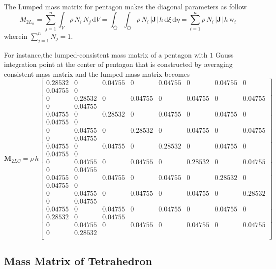 The Lumped mass matrix for pentagon makes the diagonal parameters as follow
\begin{equation}
{M}_{2L_{ii}} = \sum_{j=1}^n \int_{V}  \rho \, N_i \, N_j \, \mathrm{d} V  = \int_{\pentagon} \int_{\pentagon} \rho \, N_i \, |\mathbf{J}| \, h \,  \mathrm{d} \xi \, \mathrm{d} \eta =  \sum_{i=1}^n  \rho  \, N_i \, |\mathbf{J}| \, h \, \mathrm{w}_i
\label{LumMass2D}
\end{equation}
wherein $\sum_{j=1}^n N_j = 1$. 

For instance,the lumped-consistent mass matrix of a pentagon  with $1$ Gauss integration point at the center of pentagon that is constructed by averaging consistent mass matrix and the lumped mass matrix becomes 
\begin{equation}
\mathbf{M}_{2LC}  = \rho \, h
\begin{bmatrix}
0.28532 & 0 & 0.04755 & 0 & 0.04755 & 0 & 0.04755 & 0 \\ 0.04755 & 0 \\
0 & 0.28532 & 0 & 0.04755 & 0 & 0.04755 & 0 & 0.04755\\ 0 & 0.04755
\\
0.04755 & 0 & 0.28532 & 0 & 0.04755 & 0 & 0.04755 & 0 \\ 0.04755 & 0\\
0 & 0.04755 & 0 & 0.28532 & 0 & 0.04755 & 0 & 0.04755\\ 0 & 0.04755 \\
0.04755 & 0 & 0.04755 & 0 & 0.28532 & 0 & 0.04755 & 0 \\ 0.04755 & 0 \\
0 & 0.04755 & 0 & 0.04755 & 0 & 0.28532 & 0 & 0.04755\\ 0 & 0.04755 \\
0.04755 & 0 & 0.04755 & 0 & 0.04755 & 0 & 0.28532 & 0\\ 0.04755 & 0\\
0 & 0.04755 & 0 & 0.04755 & 0 & 0.04755 & 0 & 0.28532\\ 0 & 0.04755\\
0.04755 & 0 & 0.04755 & 0 & 0.04755 & 0 & 0.04755 & 0 \\ 0.28532 & 0 & 0.04755\\
0 & 0.04755 & 0 & 0.04755 & 0 & 0.04755 & 0 & 0.04755\\ 0 & 0.28532\\
\end{bmatrix} 
\label{LumconsMassMatrix2D}
\end{equation}


\subsection{Mass Matrix of Tetrahedron}

